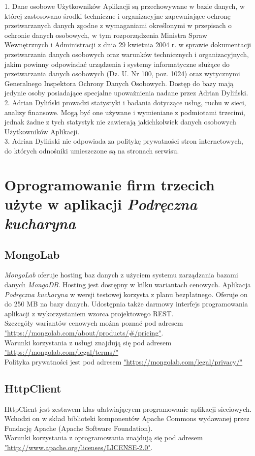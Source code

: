 \documentclass[12pt,leqno, twoside]{mwart}
\begin{document}
1. Dane osobowe Użytkowników Aplikacji są przechowywane w bazie danych, w której zastosowano środki techniczne i organizacyjne zapewniające ochronę przetwarzanych danych zgodne z wymaganiami określonymi w przepisach o ochronie danych osobowych, w tym rozporządzenia Ministra Spraw Wewnętrznych i Administracji z dnia 29 kwietnia 2004 r. w sprawie dokumentacji przetwarzania danych osobowych oraz warunków technicznych i organizacyjnych, jakim powinny odpowiadać urządzenia i systemy informatyczne służące do przetwarzania danych osobowych (Dz. U. Nr 100, poz. 1024) oraz wytycznymi Generalnego Inspektora Ochrony Danych Osobowych. Dostęp do bazy mają jedynie osoby posiadające specjalne upoważnienia nadane przez Adrian Dyliński. \\
2. Adrian Dyliński prowadzi statystyki i badania dotyczące usług, ruchu w sieci, analizy finansowe. Mogą być one używane i wymieniane z podmiotami trzecimi, jednak żadne z tych statystyk nie zawierają jakichkolwiek danych osobowych Użytkowników Aplikacji. \\
3. Adrian Dyliński nie odpowiada za politykę prywatności stron internetowych, do których odnośniki umieszczone są na stronach serwisu.

\section{Oprogramowanie firm trzecich użyte w aplikacji \emph{Podręczna kucharyna} }
\subsection{MongoLab}
\emph{MongoLab} oferuje hosting baz danych z użyciem systemu zarządzania bazami danych \emph{MongoDB}.
Hosting jest dostępny w kilku wariantach cenowych.
Aplikacja \emph{Podręczna kucharyna} w wersji testowej korzysta z planu bezpłatnego.
Oferuje on do 250 MB na bazy danych.
Udostępnia także darmowy interfejs programowania aplikacji z wykorzystaniem wzorca projektowego REST. \\
Szczegóły wariantów cenowych można poznać pod adresem \url{"https://mongolab.com/about/products/#/pricing"}. \\
Warunki korzystania z usługi znajdują się pod adresem \url{"https://mongolab.com/legal/terms/"}\\
Polityka prywatności jest pod adresem \url{"https://mongolab.com/legal/privacy/"}
\subsection{HttpClient}
HttpClient jest zestawem klas ułatwiającycm programowanie aplikacji sieciowych.
Wchodzi on w skład biblioteki komponentów Apache Commons wydawanej przez Fundację Apache (Apache Software Foundation). \\
Warunki korzystania z oprogramowania znajdują się pod adresem \url{"http://www.apache.org/licenses/LICENSE-2.0"}.
\end{document}
